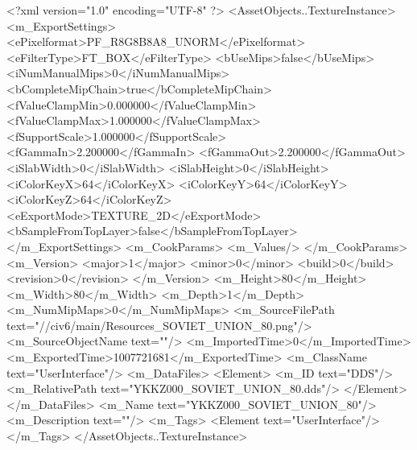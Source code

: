 <?xml version="1.0" encoding="UTF-8" ?>
<AssetObjects..TextureInstance>
	<m_ExportSettings>
		<ePixelformat>PF_R8G8B8A8_UNORM</ePixelformat>
		<eFilterType>FT_BOX</eFilterType>
		<bUseMips>false</bUseMips>
		<iNumManualMips>0</iNumManualMips>
		<bCompleteMipChain>true</bCompleteMipChain>
		<fValueClampMin>0.000000</fValueClampMin>
		<fValueClampMax>1.000000</fValueClampMax>
		<fSupportScale>1.000000</fSupportScale>
		<fGammaIn>2.200000</fGammaIn>
		<fGammaOut>2.200000</fGammaOut>
		<iSlabWidth>0</iSlabWidth>
		<iSlabHeight>0</iSlabHeight>
		<iColorKeyX>64</iColorKeyX>
		<iColorKeyY>64</iColorKeyY>
		<iColorKeyZ>64</iColorKeyZ>
		<eExportMode>TEXTURE_2D</eExportMode>
		<bSampleFromTopLayer>false</bSampleFromTopLayer>
	</m_ExportSettings>
	<m_CookParams>
		<m_Values/>
	</m_CookParams>
	<m_Version>
		<major>1</major>
		<minor>0</minor>
		<build>0</build>
		<revision>0</revision>
	</m_Version>
	<m_Height>80</m_Height>
	<m_Width>80</m_Width>
	<m_Depth>1</m_Depth>
	<m_NumMipMaps>0</m_NumMipMaps>
	<m_SourceFilePath text="//civ6/main/Resources_SOVIET_UNION_80.png"/>
	<m_SourceObjectName text=""/>
	<m_ImportedTime>0</m_ImportedTime>
	<m_ExportedTime>1007721681</m_ExportedTime>
	<m_ClassName text="UserInterface"/>
	<m_DataFiles>
		<Element>
			<m_ID text="DDS"/>
			<m_RelativePath text="YKKZ000_SOVIET_UNION_80.dds"/>
		</Element>
	</m_DataFiles>
	<m_Name text="YKKZ000_SOVIET_UNION_80"/>
	<m_Description text=""/>
	<m_Tags>
		<Element text="UserInterface"/>
	</m_Tags>
</AssetObjects..TextureInstance>

